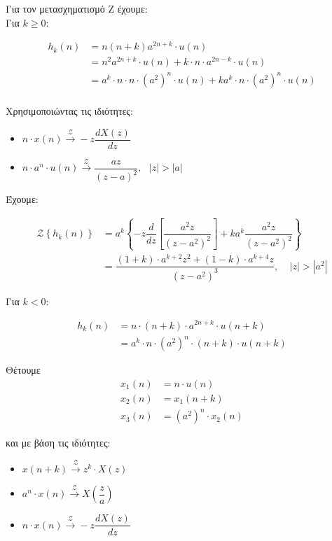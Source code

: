 \documentclass[12pt,a4paper]{article}
\begin{document}
			Για τον μετασχηματισμό Z έχουμε: \\
			
			Για $k \geq 0$:
			
			\begin{align*}
				h_k(n) &= n(n+k)a^{2n+k} \cdot u(n) \\
				&= n^2a^{2n+k} \cdot u(n) + k \cdot n \cdot a^{2n-k} \cdot u(n) \\
				&= a^k \cdot n \cdot n \cdot \left(a^2\right)^n \cdot u(n) + ka^k \cdot n \cdot \left(a^2\right)^n \cdot u(n) \\
			\end{align*}
			
			Χρησιμοποιώντας τις ιδιότητες:
			
			\begin{itemize}
				\item $ n \cdot x(n) \xrightarrow{\mathcal{Z}} -z\dfrac{dX(z)}{dz}$
				\item $ n \cdot a^n \cdot u(n) \xrightarrow{\mathcal{Z}} \dfrac{az}{(z-a)^2}, ~~~|z| > |a|$
			\end{itemize}
			
			Έχουμε:
			
			\begin{align*}
				\mathcal{Z}\left\{h_k(n)\right\} &= a^k\left\{-z\dfrac{d}{dz}\left[\dfrac{a^2z}{\left(z-a^2\right)^2}\right]+ka^k\dfrac{a^2z}{\left(z-a^2\right)^2}\right\} \\
				&= \dfrac{(1+k) \cdot a^{k+2}z^2+(1-k) \cdot a^{k+4}z}{\left(z-a^2\right)^3}, ~~~~~|z| > |a^2|
			\end{align*}
			
			Για $k < 0$:
			
			\begin{align*}
				h_k(n) &= n \cdot (n+k) \cdot a^{2n+k} \cdot u(n+k) \\
				&= a^k \cdot n \cdot \left(a^2\right)^n \cdot (n+k) \cdot u(n+k)
			\end{align*}
			
			Θέτουμε \begin{align*}
				x_1(n) &= n \cdot u(n) \\
				x_2(n) &= x_1(n+k) \\
				x_3(n) &= \left(a^2\right)^n \cdot x_2(n) 
			\end{align*}
			
			και με βάση τις ιδιότητες:
			
			\begin{itemize}
				\item $x(n+k) \xrightarrow{\mathcal{Z}} z^k \cdot X(z)$
				\item $a^n \cdot x(n) \xrightarrow{\mathcal{Z}} X\left(\dfrac{z}{a}\right)$
				\item $ n \cdot x(n) \xrightarrow{\mathcal{Z}} -z\dfrac{dX(z)}{dz}$
			\end{itemize}
			
\end{document}
